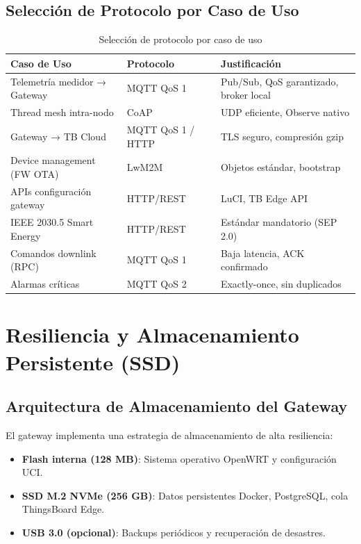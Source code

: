\subsection{Selección de Protocolo por Caso de Uso}

\begin{table}[h]
\centering
\small
\begin{tabular}{|p{4cm}|l|p{5cm}|}
\hline
\textbf{Caso de Uso} & \textbf{Protocolo} & \textbf{Justificación} \\
\hline
Telemetría medidor → Gateway & MQTT QoS 1 & Pub/Sub, QoS garantizado, broker local \\
Thread mesh intra-nodo & CoAP & UDP eficiente, Observe nativo \\
Gateway → TB Cloud & MQTT QoS 1 / HTTP & TLS seguro, compresión gzip \\
Device management (FW OTA) & LwM2M & Objetos estándar, bootstrap \\
APIs configuración gateway & HTTP/REST & LuCI, TB Edge API \\
IEEE 2030.5 Smart Energy & HTTP/REST & Estándar mandatorio (SEP 2.0) \\
Comandos downlink (RPC) & MQTT QoS 1 & Baja latencia, ACK confirmado \\
Alarmas críticas & MQTT QoS 2 & Exactly-once, sin duplicados \\
\hline
\end{tabular}
\caption{Selección de protocolo por caso de uso}
\end{table}

\section{Resiliencia y Almacenamiento Persistente (SSD)}

\subsection{Arquitectura de Almacenamiento del Gateway}

El gateway implementa una estrategia de almacenamiento de alta resiliencia:

\begin{itemize}
    \item \textbf{Flash interna (128 MB)}: Sistema operativo OpenWRT y configuración UCI.
    \item \textbf{SSD M.2 NVMe (256 GB)}: Datos persistentes Docker, PostgreSQL, cola ThingsBoard Edge.
    \item \textbf{USB 3.0 (opcional)}: Backups periódicos y recuperación de desastres.
\end{itemize}

